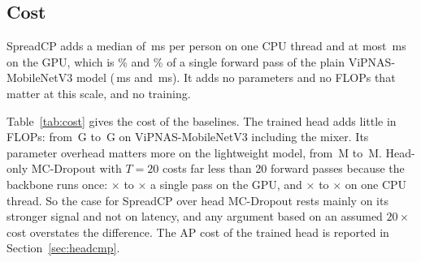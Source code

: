 \documentclass[preprint,11pt]{elsarticle}
\newcommand{\method}{SpreadCP}
\begin{document}
\begin{table}[t]
\centering\small
\caption{Seeds 0, 1 and 2 of the control and the full head on ViPNAS-MobileNetV3, mean $\pm$ SD across
seeds. AP is on val-test with ground-truth boxes. $\Delta$ is each seed's mean paired fold difference
from the control of the same seed, in AP points, then averaged across seeds. $\sigma$ and OKS are the
learned head's outputs. AUROC values are on val-test.}
\label{tab:seeds}
\end{table}

\subsection{Cost}\label{sec:cost}

\method{} adds a median of \MethodCpuMs{}\,ms per person on one CPU thread and at most
\MethodGpuMs{}\,ms on the GPU, which is \MethodCpuPct\% and \MethodGpuPct\% of a single forward pass of
the plain ViPNAS-MobileNetV3 model (\CpuOneMbvThreePlain{}\,ms and \GpuOneMbvThreePlain{}\,ms). It adds
no parameters and no FLOPs that matter at this scale, and no training.

Table~\ref{tab:cost} gives the cost of the baselines. The trained head adds little in FLOPs: from
\FlopsMbvThreePlain{}\,G to \FlopsMbvThreeFull{}\,G on ViPNAS-MobileNetV3 including the mixer. Its
parameter overhead matters more on the lightweight model, from \ParamsMbvThreePlain{}\,M to
\ParamsMbvThreeFull{}\,M. Head-only MC-Dropout with $T{=}20$ costs far less than 20 forward passes
because the backbone runs once: \GpuRatioMbvThreeHetOks{}$\times$ to \GpuRatioHmRFiveZero{}$\times$ a single
pass on the GPU, and \CpuRatioMbvThreeHetOks{}$\times$ to \CpuRatioHmRFiveZero{}$\times$ on one CPU thread.
So the case for \method{} over head MC-Dropout rests mainly on its stronger signal and not on latency,
and any argument based on an assumed $20\times$ cost overstates the difference. The AP cost of the
trained head is reported in Section~\ref{sec:headcmp}.

\begin{table}[t]
\centering\scriptsize
\caption{Model cost at batch size 1, median over 300 runs. ``Ratio'' is $T{=}20$ time over single-pass
time on the GPU. $^\ddagger$Includes the unused uncertainty modules of our head.
Sub-10\,ms GPU differences should be read with caution, since desktop applications shared the GPU.}
\label{tab:cost}
\end{table}
\end{document}
